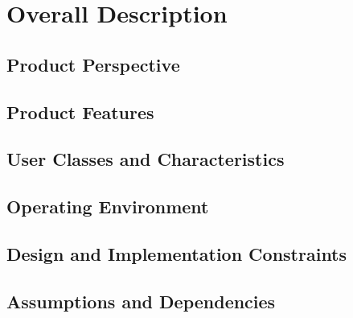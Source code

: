
\section{Overall Description}

\subsection{Product Perspective}
\subsection{Product Features}
\subsection{User Classes and Characteristics}
\subsection{Operating Environment}
\subsection{Design and Implementation Constraints}
\subsection{Assumptions and Dependencies}
